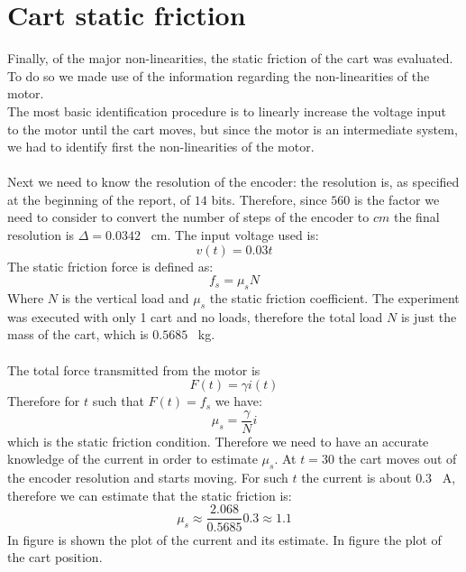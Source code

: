 \section{Cart static friction}
Finally, of the major non-linearities, the static friction of the cart was evaluated. To do so we made use of the information regarding the non-linearities of the motor. \\
The most basic identification procedure is to linearly increase the voltage input to the motor until the cart moves, but since the motor is an intermediate system, we had to identify first the non-linearities of the motor.\\ \\
Next we need to know the resolution of the encoder: the resolution is, as specified at the beginning of the report, of $14$ bits. Therefore, since $560$ is the factor we need to consider to convert the number of steps of the encoder to $cm$ the final resolution is $\Delta = 0.0342$ \SI{}{\centi \metre}. The input voltage used is:
\begin{equation}
v(t) = 0.03t
\end{equation}
The static friction force is defined as:
\begin{equation}
f_s = \mu_s  N
\end{equation}
Where $N$ is the vertical load and $\mu_s$ the static friction coefficient. The experiment was executed with only 1 cart and no loads, therefore the total load $N$ is just the mass of the cart, which is $0.5685$ \SI{}{\kilo \gram}.\\ \\
The total force transmitted from the motor is \begin{equation}
F(t) = \gamma i(t)
\end{equation}
Therefore for $t$ such that $F(t)=f_s$ we have:
\begin{equation}
\mu_s = \frac{\gamma}{N} i
\end{equation}
which is the static friction condition. Therefore we need to have an accurate knowledge of the current in order to estimate $\mu_s$. 
At $t=30$ the cart moves out of the encoder resolution and starts moving. For such $t$ the current is about $0.3$ \SI{}{\ampere}, therefore we can estimate that the static friction is:
\begin{equation}
\mu_s \approx \frac{2.068}{0.5685}0.3 \approx 1.1
\end{equation}
In figure is shown the plot of the current and its estimate. In figure the plot of the cart position.
